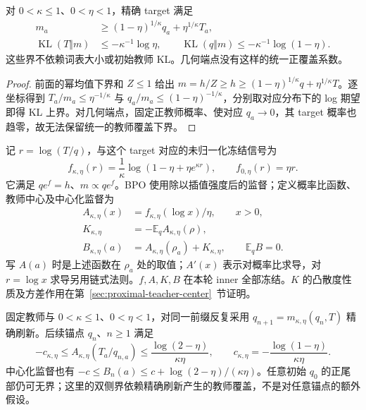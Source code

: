 \documentclass[lang=cn,scheme=chinese,openany]{../book/elegantbook}
\newcommand{\E}{\mathbb E}
\newcommand{\KL}{\operatorname{KL}}
\begin{document}
\begin{corollary}
\label{cor:power-target-coverage}
对 $0<\kappa\le1$、$0<\eta<1$，精确 target 满足
\begin{align}
 m_a&\ge(1-\eta)^{1/\kappa}q_a+\eta^{1/\kappa}T_a,\\
 \KL(T\Vert m)&\le-\kappa^{-1}\log\eta,\qquad
 \KL(q\Vert m)\le-\kappa^{-1}\log(1-\eta).
\end{align}
这些界不依赖词表大小或初始教师 KL。几何端点没有这样的统一正覆盖系数。
\end{corollary}

\begin{proof}
前面的幂均值下界和 $Z\le1$ 给出 $m=h/Z\ge h\ge(1-\eta)^{1/\kappa}q+\eta^{1/\kappa}T$。逐坐标得到 $T_a/m_a\le\eta^{-1/\kappa}$ 与 $q_a/m_a\le(1-\eta)^{-1/\kappa}$，分别取对应分布下的 log 期望即得 KL 上界。对几何端点，固定正教师概率、使对应 $q_a\to0$，其 target 概率也趋零，故无法保留统一的教师覆盖下界。
\end{proof}

记 $r=\log(T/q)$，与这个 target 对应的未归一化冻结信号为
\begin{equation}
 f_{\kappa,\eta}(r)=\frac1\kappa\log(1-\eta+\eta e^{\kappa r}),\qquad
 f_{0,\eta}(r)=\eta r.
 \label{eq:proximal-power-signal}
\end{equation}
它满足 $qe^f=h$、$m\propto qe^f$。BPO 使用除以插值强度后的监督；定义概率比函数、教师中心及中心化监督为
\begin{align}
 A_{\kappa,\eta}(x)&=f_{\kappa,\eta}(\log x)/\eta,\qquad x>0,\\
 K_{\kappa,\eta}&=-\E_q A_{\kappa,\eta}(\rho),\\
 B_{\kappa,\eta}(a)&=A_{\kappa,\eta}(\rho_a)+K_{\kappa,\eta},\qquad\E_qB=0.
 \label{eq:center-explicit-definition}
\end{align}
写 $A(a)$ 时是上述函数在 $\rho_a$ 处的取值；$A'(x)$ 表示对概率比求导，对 $r=\log x$ 求导另用链式法则。$f,A,K,B$ 在本轮 inner 全部冻结。$K$ 的凸散度性质及方差作用在第~\ref{sec:proximal-teacher-center}~节证明。

\begin{corollary}[精确刷新后的双侧监督范围]
\label{cor:power-refreshed-signal-range}
固定教师与 $0<\kappa\le1$、$0<\eta<1$，对同一前缀反复采用 $q_{n+1}=m_{\kappa,\eta}(q_n,T)$ 精确刷新。后续锚点 $q_n$、$n\ge1$ 满足
\begin{equation}
 -c_{\kappa,\eta}\le A_{\kappa,\eta}(T_a/q_{n,a})
 \le\frac{\log(2-\eta)}{\kappa\eta},\qquad
 c_{\kappa,\eta}=-\frac{\log(1-\eta)}{\kappa\eta}.
\end{equation}
中心化监督也有 $-c\le B_n(a)\le c+\log(2-\eta)/(\kappa\eta)$。任意初始 $q_0$ 的正尾部仍可无界；这里的双侧界依赖精确刷新产生的教师覆盖，不是对任意锚点的额外假设。
\end{corollary}
\end{document}
